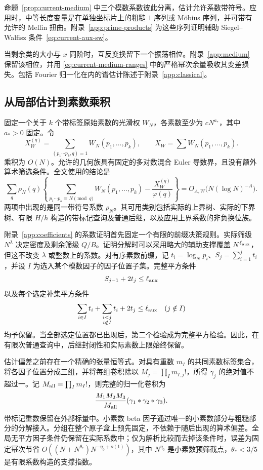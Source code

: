 命题~\ref{prop:current-medium} 中三个模数系数彼此分离，估计允许系数带符号。应用时，中等长度变量是在单独坐标片上的粗糙 $1$ 序列或 M\"obius 序列，并可带有允许的 Mellin 扭曲。附录~\ref{app:prime-products} 为这些序列证明辅助 Siegel--Walfisz 条件~\eqref{eq:current-aux-sw}。

当剩余类的大小与 $x$ 同阶时，互反变换留下一个振荡相位。附录~\ref{app:medium} 保留该相位，并用 \eqref{eq:current-medium-ranges} 中的严格幂次余量吸收其变差损失。包括 Fourier 归一化在内的谱估计陈述于附录~\ref{app:classical}。

\subsection{从局部估计到素数乘积}

固定一个关于 $k$ 个带标签原始素数的光滑权 $W_N$，各素数至少为 $cN^{a_*}$，其中 $a_*>0$ 固定。令
\[
 X_W^{(q)}=\sum_{(p_1\cdots p_k,q)=1}W_N(p_1,\ldots,p_k),
 \qquad X_W=\sum W_N(p_1,\ldots,p_k).
\]
乘积为 $O(N)$。允许的几何族具有固定的多对数混合 Euler 导数界，且没有额外算术筛选条件。全文使用的结论是
\begin{equation}
 \sum_q\rho_N(q)
 \left\{\sum_{p_1\cdots p_k\equiv N\pmod q}W_N(p_1,\ldots,p_k)
            -\frac{X_W^{(q)}}{\varphi(q)}\right\}
       =O_{A,W}\bigl(N(\log N)^{-A}\bigr).
 \label{eq:current-PP}
\end{equation}
两项中出现的是同一带符号系数 $\rho_N$。其可用类别包括实际的上界树、实际的下界树、有限 $H/h$ 构造的带标记查询及普通后继，以及应用上界系数的非负换位族。

附录~\ref{app:coefficients} 的系数证明首先固定一个有限的前缀决策规则。实际筛级 $N^\lambda$ 决定密度及剩余筛级 $Q/B$。证明分解时可以采用略大的辅助支撑覆盖 $N^{\ell_{\rm aux}}$，但这不改变 $\lambda$ 或整数上的系数。对有序素数前缀，记 $t_i=\log_Np_i$、$S_j=\sum_{i=1}^jt_i$，并设 $I$ 为选入某个模数因子的因子位置子集。完整平方条件
\[
 S_{j-1}+2t_j\le\ell_{\rm aux}
\]
以及每个选定补集平方条件
\[
 \sum_{i\in I}t_i+
       \sum_{\substack{i<j\\i\notin I}}t_i+2t_j
       \le\ell_{\rm aux}\quad(j\notin I)
\]
均予保留。当全部选定位置都已出现后，第二个检验成为完整平方检验。因此，在有限次普通查询中，后继封闭性和实际素数上限始终保留。

估计偏差之前存在一个精确的张量恒等式。对具有重数 $m_I$ 的共同素数标签集合，将各因子位置分成三组，并将每组卷积除以 $M_j=\prod_I m_{I,j}!$，所得 $\gamma_j$ 的绝对值不超过一。记 $M_{\rm all}=\prod_I m_I!$，则完整的归一化卷积为
\[
 \frac{M_1M_2M_3}{M_{\rm all}}
                       (\gamma_1*\gamma_2*\gamma_3).
\]
带标记重数保留在外部标量中。小素数 beta 因子通过唯一的小素数部分与粗糙部分的分解接入。分组在整个原子盒上预先固定，不依赖于随后出现的算术偏差。全局无平方因子条件仍保留在实际系数中；仅为解析比较而去掉该条件时，误差为固定幂次节省
$O((N+N^{\theta_*})N^{-\eta_0+o(1)})$，其中 $N^{\eta_0}$ 是小素数预筛截点，$\theta_*<3/5$ 是有限系数构造的支撑指数。

